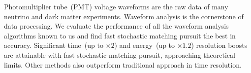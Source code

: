 Photomultiplier tube~(PMT) voltage waveforms are the raw data of many neutrino and dark matter experiments. Waveform analysis is the cornerstone of data processing. We evaluate the performance of all the waveform analysis algorithms known to us and find fast stochastic matching pursuit the best in accuracy. Significant time~(up to $\times 2$) and energy~(up to $\times 1.2$) resolution boosts are attainable with fast stochastic matching pursuit, approaching theoretical limits.  Other methods also outperform traditional approach in time resolution.
